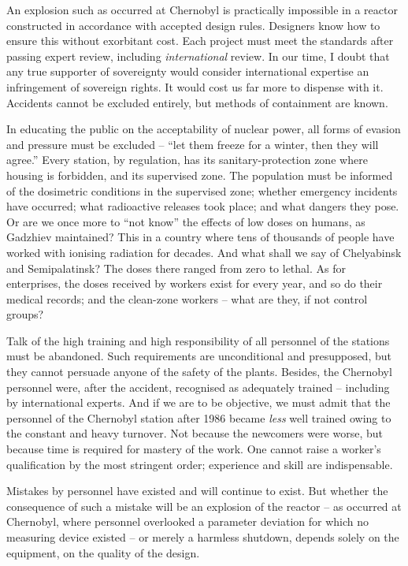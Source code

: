 \documentclass[openright]{bookest}
\begin{document}
An explosion such as occurred at Chernobyl is practically impossible in a reactor constructed in accordance with accepted design rules. Designers know how to ensure this without exorbitant cost. Each project must meet the standards after passing expert review, including \textit{international} review. In our time, I doubt that any true supporter of sovereignty would consider international expertise an infringement of sovereign rights. It would cost us far more to dispense with it. Accidents cannot be excluded entirely, but methods of containment are known.

In educating the public on the acceptability of nuclear power, all forms of evasion and pressure must be excluded -- ``let them freeze for a winter, then they will agree.'' Every station, by regulation, has its sanitary-protection zone where housing is forbidden, and its supervised zone. The population must be informed of the dosimetric conditions in the supervised zone; whether emergency incidents have occurred; what radioactive releases took place; and what dangers they pose. Or are we once more to ``not know'' the effects of low doses on humans, as Gadzhiev maintained? This in a country where tens of thousands of people have worked with ionising radiation for decades. And what shall we say of Chelyabinsk and Semipalatinsk? The doses there ranged from zero to lethal. As for enterprises, the doses received by workers exist for every year, and so do their medical records; and the clean-zone workers -- what are they, if not control groups?

Talk of the high training and high responsibility of all personnel of the stations must be abandoned. Such requirements are unconditional and presupposed, but they cannot persuade anyone of the safety of the plants. Besides, the Chernobyl personnel were, after the accident, recognised as adequately trained -- including by international experts. And if we are to be objective, we must admit that the personnel of the Chernobyl station after 1986 became \textit{less} well trained owing to the constant and heavy turnover. Not because the newcomers were worse, but because time is required for mastery of the work. One cannot raise a worker's qualification by the most stringent order; experience and skill are indispensable.

Mistakes by personnel have existed and will continue to exist. But whether the consequence of such a mistake will be an explosion of the reactor -- as occurred at Chernobyl, where personnel overlooked a parameter deviation for which no measuring device existed -- or merely a harmless shutdown, depends solely on the equipment, on the quality of the design.
\end{document}
